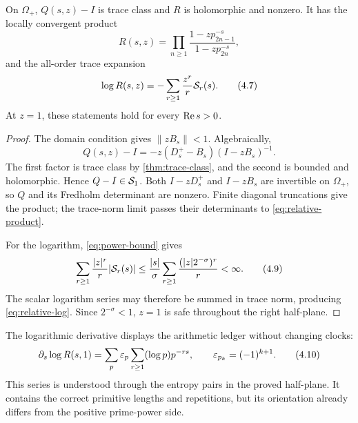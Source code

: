 \begin{theorem}
\label{thm:relative-determinant}
On $\Omega_+$, $Q(s,z)-I$ is trace class and $R$ is holomorphic and nonzero.
It has the locally convergent product
\[
 R(s,z)=\prod_{n\ge1}
 \frac{1-zp_{2n-1}^{-s}}{1-zp_{2n}^{-s}},       \tag{4.6}
 \label{eq:relative-product}
\]
and the all-order trace expansion
\[
 \log R(s,z)=-\sum_{r\ge1}\frac{z^r}{r}\mathcal S_r(s).                  \tag{4.7}
 \label{eq:relative-log}
\]
At $z=1$, these statements hold for every $\operatorname{Re} s>0$.
\end{theorem}

\begin{proof}
The domain condition gives $\|zB_s\|<1$.  Algebraically,
\[
 Q(s,z)-I=-z(D_s^+-B_s)(I-zB_s)^{-1}.           \tag{4.8}
\]
The first factor is trace class by \cref{thm:trace-class}, and the second is
bounded and holomorphic.  Hence $Q-I\in\mathcal S_1$.  Both $I-zD_s^+$ and $I-zB_s$
are invertible on $\Omega_+$, so $Q$ and its Fredholm determinant are
nonzero.  Finite diagonal truncations give the product; the trace-norm limit
passes their determinants to \eqref{eq:relative-product}.

For the logarithm, \cref{eq:power-bound} gives
\[
 \sum_{r\ge1}\frac{|z|^r}{r}|\mathcal S_r(s)|
 \le \frac{|s|}{\sigma}
       \sum_{r\ge1}\frac{(|z|2^{-\sigma})^r}{r}<\infty.           \tag{4.9}
\]
The scalar logarithm series may therefore be summed in trace norm, producing
\eqref{eq:relative-log}.  Since $2^{-\sigma}<1$, $z=1$ is safe throughout the
right half-plane.
\end{proof}

The logarithmic derivative displays the arithmetic ledger without changing
clocks:
\[
 \partial_s\log R(s,1)
 =\sum_{p}\varepsilon_p\sum_{r\ge1}(\log p)p^{-rs},
 \qquad
 \varepsilon_{p_k}=(-1)^{k+1}.                         \tag{4.10}
\]
This series is understood through the entropy pairs in the proved half-plane.
It contains the correct primitive lengths and repetitions, but its orientation
already differs from the positive prime-power side.
